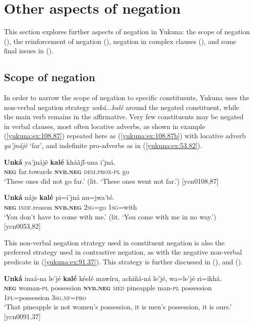 \documentclass[output=paper,colorlinks,citecolor=brown]{langscibook}
\begin{document}
\section{Other aspects of negation}

This section explores further aspects of negation in Yukuna: the scope of negation (), the reinforcement of negation (), negation in complex clauses (), and some final issues in (). 

\subsection{Scope of negation}\label{yukuna:scope}

In order to narrow the scope of negation to specific constituents, Yukuna uses the non-verbal negation strategy \textit{unká}{...}\textit{kalé} around the negated constituent, while the main verb remains in the affirmative. Very few constituents may be negated in verbal clauses, most often locative adverbs, as shown in example (\ref{yukuna:ex:108.87}) repeated here as (\ref{yukuna:ex:108.87b}) with locative adverb \textit{ya'jnájẽ} ‘far', and indefinite pro-adverbs as in (\ref{yukuna:ex:53.82}). 

\ea\label{yukuna:ex:108.87b}
\gll \textbf{Unká} ya'jnájẽ \textbf{kalé} kháãjĩ́-una i'jná.\\
\textbf{\textsc{neg}} far.towards \textbf{\textsc{nvb.neg}} \textsc{dem.prox}-\textsc{pl} go\\
\glt ‘These ones did not go far.’ (lit. ‘These ones went not far.’) [ycn0108,87]
\z

\ea\label{yukuna:ex:53.82}
\gll \textbf{Unká} náje \textbf{kalé} pi=i'jná nu=jwa'té. \\
\textbf{\textsc{neg}} \textsc{indf}.reason \textbf{\textsc{nvb.neg}} \textsc{2sg}=go \textsc{1sg}=with\\
\glt ‘You don't have to come with me.’ (lit. ‘You come with me in no way.’) [ycn0053,82]
\z

This non-verbal negation strategy used in constituent negation is also the preferred strategy used in contrastive negation, as with the negative non-verbal predicate in (\ref{yukuna:ex:91.37}). This strategy is further discussed in (), and ().

\ea\label{yukuna:ex:91.37}
\gll \textbf{Unká} inaá-na le'jé \textbf{kalé} kéelé mawíru, achiñá-ná le'jé, wa=le'jé ri=ikhá. \\
\textbf{\textsc{neg}} woman-\textsc{pl} possession \textbf{\textsc{nvb.neg}} \textsc{med} pineapple man-\textsc{pl} possession \textsc{1pl}=possession \textsc{3sg.nf=pro}\\
\glt ‘That pineapple is not women's possession, it is men's possession, it is ours.' [ycn0091,37]
\z
\end{document}
